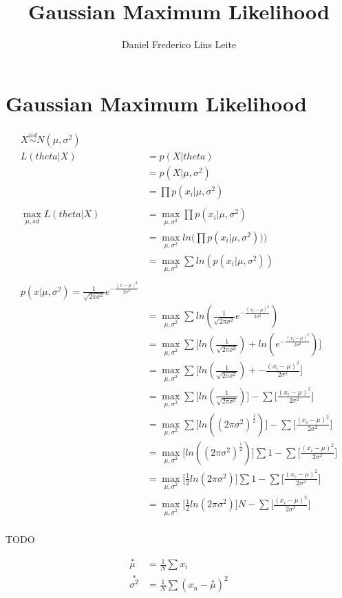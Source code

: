 \documentclass[10pt,a4paper]{article}
\author{Daniel Frederico Lins Leite}
\title{Gaussian Maximum Likelihood}
\begin{document}
	\maketitle
	
	\section{Gaussian Maximum Likelihood}
	\begin{align*}
		X \overset{iid}{\sim} N(\mu,\sigma^2)\\
		L(theta|X) &= p(X|theta)\\
		&= p(X|\mu,\sigma^2)\\
		&= \prod{p(x_i|\mu,\sigma^2)}\\
		\\
		\max_{\mu,sd}{L(theta|X)} &= \max_{\mu,\sigma^2}{\prod{p(x_i|\mu,\sigma^2)}}\\
		&= \max_{\mu,\sigma^2}{ln(\prod{p(x_i|\mu,\sigma^2)))}}\\
		&= \max_{\mu,\sigma^2}{\sum{ln(p(x_i|\mu,\sigma^2))}}\\
		\\
		p(x|\mu,\sigma^2) = \frac{1}{\sqrt{2\pi\sigma^2}} e^{-\frac{(x-\mu)^2}{2\sigma^2}}
		\\
		&= \max_{\mu,\sigma^2}{\sum{ln(\frac{1}{\sqrt{2\pi\sigma^2}} e^{-\frac{(x_i-\mu)^2}{2\sigma^2}})}}\\
		&= \max_{\mu,\sigma^2}{\sum{\big[ln(\frac{1}{\sqrt{2\pi\sigma^2}})+ln( e^{-\frac{(x_i-\mu)^2}{2\sigma^2}})\big]}}\\
		&= \max_{\mu,\sigma^2}{\sum{\big[ln(\frac{1}{\sqrt{2\pi\sigma^2}})+-\frac{(x_i-\mu)^2}{2\sigma^2}\big]}}\\
		&= \max_{\mu,\sigma^2}{\sum{\big[ln(\frac{1}{\sqrt{2\pi\sigma^2}})\big]-\sum{\big[\frac{(x_i-\mu)^2}{2\sigma^2}\big]}}}\\
		&= \max_{\mu,\sigma^2}{\sum{\big[ln((2\pi\sigma^2)^{\frac{1}{2}})\big]-\sum{\big[\frac{(x_i-\mu)^2}{2\sigma^2}\big]}}}\\
		&= \max_{\mu,\sigma^2}{\big[ln((2\pi\sigma^2)^{\frac{1}{2}})\big]\sum{1}-\sum{\big[\frac{(x_i-\mu)^2}{2\sigma^2}\big]}}\\
		&= \max_{\mu,\sigma^2}{\big[\frac{1}{2}ln(2\pi\sigma^2)\big]\sum{1}-\sum{\big[\frac{(x_i-\mu)^2}{2\sigma^2}\big]}}\\
		&= \max_{\mu,\sigma^2}{\big[\frac{1}{2}ln(2\pi\sigma^2)\big]N-\sum{\big[\frac{(x_i-\mu)^2}{2\sigma^2}\big]}}\\
	\end{align*}
	
	TODO
	
	\begin{align*}
		\overset{*}{\mu} &= \frac{1}{N}\sum{x_i}\\
		\overset{*}{\sigma^2}&=\frac{1}{N}\sum{(x_n-\overset{*}{\mu})^2}
	\end{align*}
\end{document}
